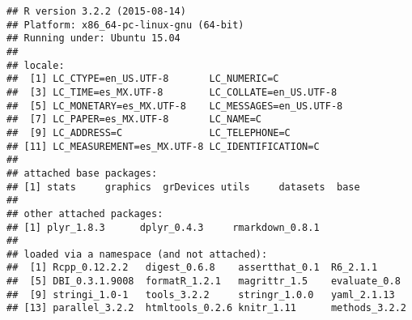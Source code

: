\documentclass[]{article}
\begin{document}
\begin{verbatim}
## R version 3.2.2 (2015-08-14)
## Platform: x86_64-pc-linux-gnu (64-bit)
## Running under: Ubuntu 15.04
## 
## locale:
##  [1] LC_CTYPE=en_US.UTF-8       LC_NUMERIC=C              
##  [3] LC_TIME=es_MX.UTF-8        LC_COLLATE=en_US.UTF-8    
##  [5] LC_MONETARY=es_MX.UTF-8    LC_MESSAGES=en_US.UTF-8   
##  [7] LC_PAPER=es_MX.UTF-8       LC_NAME=C                 
##  [9] LC_ADDRESS=C               LC_TELEPHONE=C            
## [11] LC_MEASUREMENT=es_MX.UTF-8 LC_IDENTIFICATION=C       
## 
## attached base packages:
## [1] stats     graphics  grDevices utils     datasets  base     
## 
## other attached packages:
## [1] plyr_1.8.3      dplyr_0.4.3     rmarkdown_0.8.1
## 
## loaded via a namespace (and not attached):
##  [1] Rcpp_0.12.2.2   digest_0.6.8    assertthat_0.1  R6_2.1.1       
##  [5] DBI_0.3.1.9008  formatR_1.2.1   magrittr_1.5    evaluate_0.8   
##  [9] stringi_1.0-1   tools_3.2.2     stringr_1.0.0   yaml_2.1.13    
## [13] parallel_3.2.2  htmltools_0.2.6 knitr_1.11      methods_3.2.2
\end{verbatim}
\end{document}
